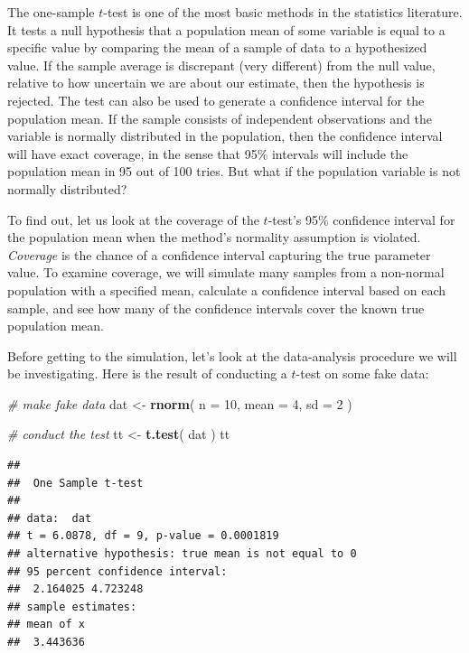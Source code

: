 \documentclass[
]{book}
\newenvironment{Shaded}{\begin{snugshade}}{\end{snugshade}}
\newcommand{\AttributeTok}[1]{\textcolor[rgb]{0.13,0.29,0.53}{#1}}
\newcommand{\CommentTok}[1]{\textcolor[rgb]{0.56,0.35,0.01}{\textit{#1}}}
\newcommand{\DecValTok}[1]{\textcolor[rgb]{0.00,0.00,0.81}{#1}}
\newcommand{\FunctionTok}[1]{\textcolor[rgb]{0.13,0.29,0.53}{\textbf{#1}}}
\newcommand{\NormalTok}[1]{#1}
\newcommand{\OtherTok}[1]{\textcolor[rgb]{0.56,0.35,0.01}{#1}}
\begin{document}
The one-sample \(t\)-test is one of the most basic methods in the statistics literature.
It tests a null hypothesis that a population mean of some variable is equal to a specific value by comparing the mean of a sample of data to a hypothesized value.
If the sample average is discrepant (very different) from the null value, relative to how uncertain we are about our estimate, then the hypothesis is rejected.
The test can also be used to generate a confidence interval for the population mean.
If the sample consists of independent observations and the variable is normally distributed in the population, then the confidence interval will have exact coverage, in the sense that 95\% intervals will include the population mean in 95 out of 100 tries.
But what if the population variable is not normally distributed?

To find out, let us look at the coverage of the \(t\)-test's 95\% confidence interval for the population mean when the method's normality assumption is violated.
\emph{Coverage} is the chance of a confidence interval capturing the true parameter value.
To examine coverage, we will simulate many samples from a non-normal population with a specified mean, calculate a confidence interval based on each sample, and see how many of the confidence intervals cover the known true population mean.

Before getting to the simulation, let's look at the data-analysis procedure we will be investigating.
Here is the result of conducting a \(t\)-test on some fake data:

\begin{Shaded}
\begin{Highlighting}[]
\CommentTok{\# make fake data}
\NormalTok{dat }\OtherTok{\textless{}{-}} \FunctionTok{rnorm}\NormalTok{( }\AttributeTok{n =} \DecValTok{10}\NormalTok{, }\AttributeTok{mean =} \DecValTok{4}\NormalTok{, }\AttributeTok{sd =} \DecValTok{2}\NormalTok{ )}

\CommentTok{\# conduct the test}
\NormalTok{tt }\OtherTok{\textless{}{-}} \FunctionTok{t.test}\NormalTok{( dat )}
\NormalTok{tt}
\end{Highlighting}
\end{Shaded}

\begin{verbatim}
## 
##  One Sample t-test
## 
## data:  dat
## t = 6.0878, df = 9, p-value = 0.0001819
## alternative hypothesis: true mean is not equal to 0
## 95 percent confidence interval:
##  2.164025 4.723248
## sample estimates:
## mean of x 
##  3.443636
\end{verbatim}
\end{document}
